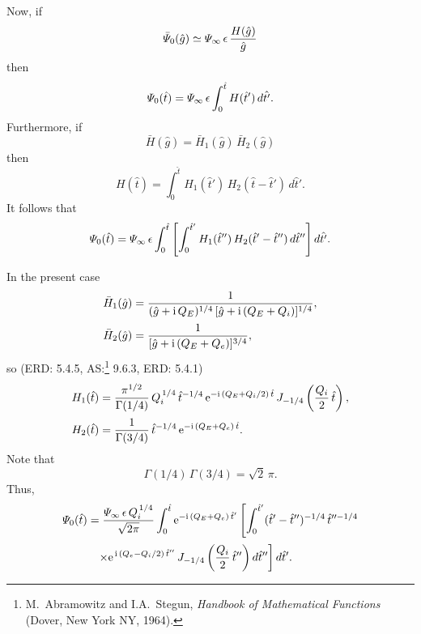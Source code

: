 \documentclass[titlepage=false,12pt]{article}
\begin{document}
Now, if
\begin{equation}
\bar{\mit\Psi}_{0}(\hat{g}) \simeq {\mit\Psi}_\infty\,\epsilon\,\frac{H(\hat{g})}{\hat{g}}
\end{equation}
then
\begin{equation}
{\mit\Psi}_0(\hat{t}) = {\mit\Psi}_\infty\,\epsilon\int_0^{\hat{t}}H(\hat{t}')\,d\hat{t'}.
\end{equation}
Furthermore, if
\begin{equation}
\bar{H}(\hat{g}) = \bar{H}_1(\hat{g})\,\bar{H}_2(\hat{g})
\end{equation}
then
\begin{equation}
H(\hat{t})=\int_0^{\hat{t}}H_1(\hat{t}')\,H_2(\hat{t}-\hat{t}')\,d\hat{t}'.
\end{equation}
It follows that
\begin{equation}
{\mit\Psi}_0(\hat{t}) = {\mit\Psi}_\infty\,\epsilon\int_0^{\hat{t}}\left[\int_0^{\hat{t}'}
H_1(\hat{t}'')\,H_2(\hat{t}'-\hat{t}'')\,d\hat{t}''\right]d\hat{t'}.
\end{equation}

In the present case
\begin{align}
\bar{H}_1(\hat{g}) &= \frac{1}{(\hat{g}+{\rm i}\,Q_E)^{1/4}\,[\hat{g}+ {\rm i}\,(Q_E+Q_i)]^{1/4}},\\[0.5ex]
\bar{H}_2(\hat{g}) &= \frac{1}{[\hat{g}+{\rm i}\,(Q_E+Q_e)]^{3/4}},
\end{align}
so (ERD: 5.4.5, AS:\footnote{M.~Abramowitz and I.A.~Stegun, {\em Handbook of Mathematical Functions}\/ (Dover, New York NY, 1964).} 9.6.3, ERD: 5.4.1)
\begin{align}
H_1(\hat{t}) &= \frac{\pi^{1/2}}{\Gamma(1/4)}\,Q_i^{\,1/4}\,\hat{t}^{-1/4}\,{\rm e}^{-{\rm i}\,(Q_E+Q_i/2)\,\hat{t}}\,J_{-1/4}\left(\frac{Q_i}{2}\,\hat{t}\right),\\[0.5ex]
H_2(\hat{t})&= \frac{1}{\Gamma(3/4)}\,\hat{t}^{-1/4}\,{\rm e}^{-{\rm i}\,(Q_E+Q_e)\,\hat{t}}.
\end{align}
Note that
\begin{equation}
\Gamma(1/4)\,\Gamma(3/4) = \sqrt{2}\,\pi.
\end{equation}
Thus,
\begin{align}
{\mit\Psi}_0(\hat{t}) &= \frac{{\mit\Psi}_\infty\,\epsilon\,Q_i^{\,1/4}}{\sqrt{2\pi}}\int_0^{\hat{t}}{\rm e}^{-{\rm i}\,(Q_E+Q_e)\,\hat{t}'}\left[
\int_0^{\hat{t}'}(\hat{t}'-\hat{t}'')^{-1/4}\,\hat{t}''^{-1/4}\right.\nonumber\\[0.5ex]
&\phantom{=}\left.\times{\rm e}^{\,{\rm i}\,(Q_e-Q_i/2)\,\hat{t}''}\,J_{-1/4}\left(\frac{Q_i}{2}\,\hat{t}''\right)d\hat{t}''\right]d\hat{t}'.
\end{align}
\end{document}
